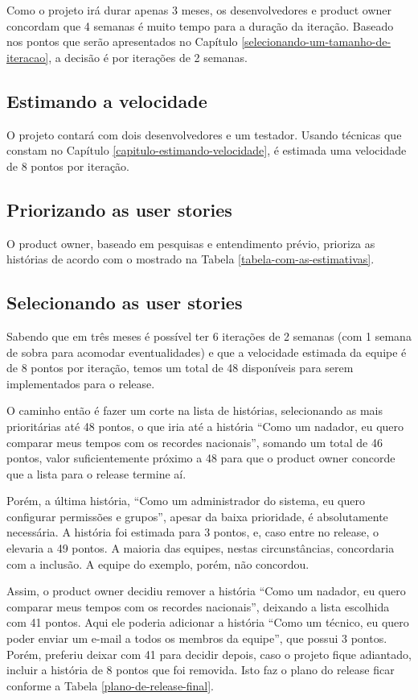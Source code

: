 \documentclass[a4paper,abntfigtabnum,noindentfirst]{abnt}
\begin{document}
Como o projeto irá durar apenas 3 meses, os desenvolvedores e product owner concordam que 4 semanas é muito tempo para a duração da iteração. Baseado nos pontos que serão apresentados no Capítulo \ref{selecionando-um-tamanho-de-iteracao}, a decisão é por iterações de 2 semanas.


\subsection{Estimando a velocidade}

O projeto contará com dois desenvolvedores e um testador. Usando técnicas que constam no Capítulo \ref{capitulo-estimando-velocidade}, é estimada uma velocidade de 8 pontos por iteração.


\subsection{Priorizando as user stories}

O product owner, baseado em pesquisas e entendimento prévio, prioriza as histórias de acordo com o mostrado na Tabela \ref{tabela-com-as-estimativas}.


\subsection{Selecionando as user stories}

Sabendo que em três meses é possível ter 6 iterações de 2 semanas (com 1 semana de sobra para acomodar eventualidades) e que a velocidade estimada da equipe é de 8 pontos por iteração, temos um total de 48 disponíveis para serem implementados para o release.

O caminho então é fazer um corte na lista de histórias, selecionando as mais prioritárias até 48 pontos, o que iria até a história ``Como um nadador, eu quero comparar meus tempos com os recordes nacionais'', somando um total de 46 pontos, valor suficientemente próximo a 48 para que o product owner concorde que a lista para o release termine aí.

Porém, a última história, ``Como um administrador do sistema, eu quero configurar permissões e grupos'', apesar da baixa prioridade, é absolutamente necessária. A história foi estimada para 3 pontos, e, caso entre no release, o elevaria a 49 pontos. A maioria das equipes, nestas circunstâncias, concordaria com a inclusão. A equipe do exemplo, porém, não concordou.

Assim, o product owner decidiu remover a história ``Como um nadador, eu quero comparar meus tempos com os recordes nacionais'', deixando a lista escolhida com 41 pontos. Aqui ele poderia adicionar a história ``Como um técnico, eu quero poder enviar um e-mail a todos os membros da equipe'', que possui 3 pontos. Porém, preferiu deixar com 41 para decidir depois, caso o projeto fique adiantado, incluir a história de 8 pontos que foi removida. Isto faz o plano do release ficar conforme a Tabela \ref{plano-de-release-final}.
\end{document}
